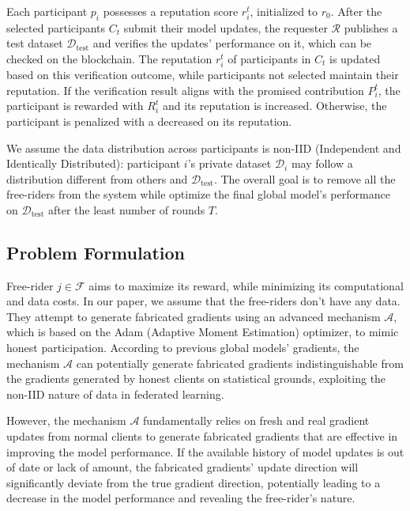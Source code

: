 \documentclass[conference]{IEEEtran}
\begin{document}
Each participant $p_i$ possesses a reputation score $r_i^t$, initialized to $r_0$. 
After the selected participants $C_t$ submit their model updates, the requester $\mathcal{R}$ publishes a test dataset $\mathcal{D}_{\text{test}}$ and verifies the updates' performance on it, which can be checked on the blockchain.
The reputation $r_i^t$ of participants in $C_t$ is updated based on this verification outcome, while participants not selected maintain their reputation. 
If the verification result aligns with the promised contribution $P_i^t$, the participant is rewarded with $R_i^t$ and its reputation is increased.
Otherwise, the participant is penalized with a decreased on its reputation.

We assume the data distribution across participants is non-IID (Independent and Identically Distributed): participant $i$'s private dataset $\mathcal{D}_i$ may follow a distribution different from others and $\mathcal{D}_{\text{test}}$.
The overall goal is to remove all the free-riders from the system while optimize the final global model's performance on $\mathcal{D}_{\text{test}}$ after the least number of rounds $T$.

\subsection{Problem Formulation}
\label{sec:problem_formulation}
Free-rider $j \in \mathcal{F}$ aims to maximize its reward, while minimizing its computational and data costs.
In our paper, we assume that the free-riders don't have any data. They attempt to generate fabricated gradients using an advanced mechanism $\mathcal{A}$, which is based on the Adam (Adaptive Moment Estimation) optimizer, to mimic honest participation.
According to previous global models' gradients, the mechanism $\mathcal{A}$ can potentially generate fabricated gradients indistinguishable from the gradients generated by honest clients on statistical grounds, exploiting the non-IID nature of data in federated learning.

However, the mechanism $\mathcal{A}$ fundamentally relies on fresh and real gradient updates from normal clients to generate fabricated gradients that are effective in improving the model performance.
If the available history of model updates is out of date or lack of amount, the fabricated gradients' update direction will significantly deviate from the true gradient direction, potentially leading to a decrease in the model performance and revealing the free-rider's nature.
\end{document}
